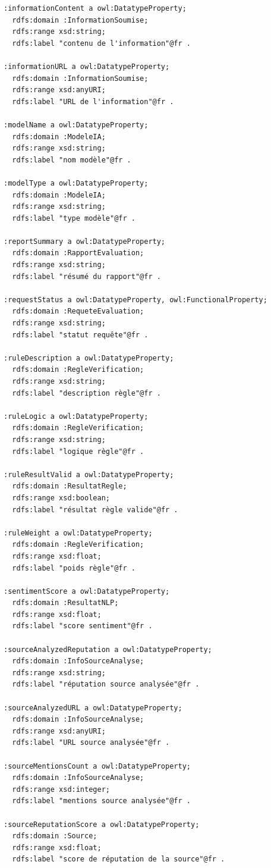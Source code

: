 \documentclass[9pt,twocolumn,twoside,french]{article}
\begin{document}
\begin{lstlisting}[language=Turtle,basicstyle=\ttfamily\tiny,frame=single]
:informationContent a owl:DatatypeProperty;
  rdfs:domain :InformationSoumise;
  rdfs:range xsd:string;
  rdfs:label "contenu de l'information"@fr .

:informationURL a owl:DatatypeProperty;
  rdfs:domain :InformationSoumise;
  rdfs:range xsd:anyURI;
  rdfs:label "URL de l'information"@fr .

:modelName a owl:DatatypeProperty;
  rdfs:domain :ModeleIA;
  rdfs:range xsd:string;
  rdfs:label "nom modèle"@fr .

:modelType a owl:DatatypeProperty;
  rdfs:domain :ModeleIA;
  rdfs:range xsd:string;
  rdfs:label "type modèle"@fr .

:reportSummary a owl:DatatypeProperty;
  rdfs:domain :RapportEvaluation;
  rdfs:range xsd:string;
  rdfs:label "résumé du rapport"@fr .

:requestStatus a owl:DatatypeProperty, owl:FunctionalProperty;
  rdfs:domain :RequeteEvaluation;
  rdfs:range xsd:string;
  rdfs:label "statut requête"@fr .

:ruleDescription a owl:DatatypeProperty;
  rdfs:domain :RegleVerification;
  rdfs:range xsd:string;
  rdfs:label "description règle"@fr .

:ruleLogic a owl:DatatypeProperty;
  rdfs:domain :RegleVerification;
  rdfs:range xsd:string;
  rdfs:label "logique règle"@fr .

:ruleResultValid a owl:DatatypeProperty;
  rdfs:domain :ResultatRegle;
  rdfs:range xsd:boolean;
  rdfs:label "résultat règle valide"@fr .

:ruleWeight a owl:DatatypeProperty;
  rdfs:domain :RegleVerification;
  rdfs:range xsd:float;
  rdfs:label "poids règle"@fr .

:sentimentScore a owl:DatatypeProperty;
  rdfs:domain :ResultatNLP;
  rdfs:range xsd:float;
  rdfs:label "score sentiment"@fr .

:sourceAnalyzedReputation a owl:DatatypeProperty;
  rdfs:domain :InfoSourceAnalyse;
  rdfs:range xsd:string;
  rdfs:label "réputation source analysée"@fr .

:sourceAnalyzedURL a owl:DatatypeProperty;
  rdfs:domain :InfoSourceAnalyse;
  rdfs:range xsd:anyURI;
  rdfs:label "URL source analysée"@fr .

:sourceMentionsCount a owl:DatatypeProperty;
  rdfs:domain :InfoSourceAnalyse;
  rdfs:range xsd:integer;
  rdfs:label "mentions source analysée"@fr .

:sourceReputationScore a owl:DatatypeProperty;
  rdfs:domain :Source;
  rdfs:range xsd:float;
  rdfs:label "score de réputation de la source"@fr .


\end{lstlisting}
\end{document}
